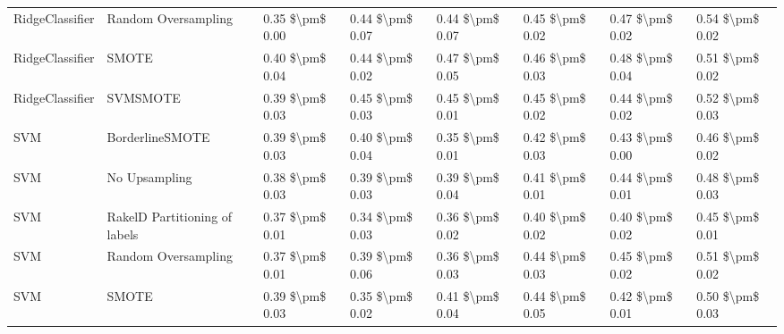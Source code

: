 \begin{tabular}{llllllll}
                RidgeClassifier &           Random Oversampling & 0.35 \$\textbackslash pm\$ 0.00 &           0.44 \$\textbackslash pm\$ 0.07 &       0.44 \$\textbackslash pm\$ 0.07 &        0.45 \$\textbackslash pm\$ 0.02 &                         0.47 \$\textbackslash pm\$ 0.02 &     0.54 \$\textbackslash pm\$ 0.02 \\
                RidgeClassifier &                         SMOTE & 0.40 \$\textbackslash pm\$ 0.04 &           0.44 \$\textbackslash pm\$ 0.02 &       0.47 \$\textbackslash pm\$ 0.05 &        0.46 \$\textbackslash pm\$ 0.03 &                         0.48 \$\textbackslash pm\$ 0.04 &     0.51 \$\textbackslash pm\$ 0.02 \\
                RidgeClassifier &                      SVMSMOTE & 0.39 \$\textbackslash pm\$ 0.03 &           0.45 \$\textbackslash pm\$ 0.03 &       0.45 \$\textbackslash pm\$ 0.01 &        0.45 \$\textbackslash pm\$ 0.02 &                         0.44 \$\textbackslash pm\$ 0.02 &     0.52 \$\textbackslash pm\$ 0.03 \\
                            SVM &               BorderlineSMOTE & 0.39 \$\textbackslash pm\$ 0.03 &           0.40 \$\textbackslash pm\$ 0.04 &       0.35 \$\textbackslash pm\$ 0.01 &        0.42 \$\textbackslash pm\$ 0.03 &                         0.43 \$\textbackslash pm\$ 0.00 &     0.46 \$\textbackslash pm\$ 0.02 \\
                            SVM &                 No Upsampling & 0.38 \$\textbackslash pm\$ 0.03 &           0.39 \$\textbackslash pm\$ 0.03 &       0.39 \$\textbackslash pm\$ 0.04 &        0.41 \$\textbackslash pm\$ 0.01 &                         0.44 \$\textbackslash pm\$ 0.01 &     0.48 \$\textbackslash pm\$ 0.03 \\
                            SVM & RakelD Partitioning of labels & 0.37 \$\textbackslash pm\$ 0.01 &           0.34 \$\textbackslash pm\$ 0.03 &       0.36 \$\textbackslash pm\$ 0.02 &        0.40 \$\textbackslash pm\$ 0.02 &                         0.40 \$\textbackslash pm\$ 0.02 &     0.45 \$\textbackslash pm\$ 0.01 \\
                            SVM &           Random Oversampling & 0.37 \$\textbackslash pm\$ 0.01 &           0.39 \$\textbackslash pm\$ 0.06 &       0.36 \$\textbackslash pm\$ 0.03 &        0.44 \$\textbackslash pm\$ 0.03 &                         0.45 \$\textbackslash pm\$ 0.02 &     0.51 \$\textbackslash pm\$ 0.02 \\
                            SVM &                         SMOTE & 0.39 \$\textbackslash pm\$ 0.03 &           0.35 \$\textbackslash pm\$ 0.02 &       0.41 \$\textbackslash pm\$ 0.04 &        0.44 \$\textbackslash pm\$ 0.05 &                         0.42 \$\textbackslash pm\$ 0.01 &     0.50 \$\textbackslash pm\$ 0.03 \\

\end{tabular}
